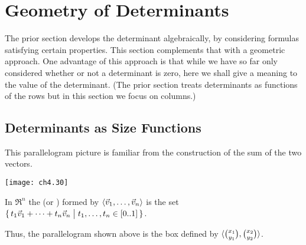 \section{Geometry of Determinants}
The prior section develops the determinant algebraically, by
considering formulas satisfying certain properties.
This section complements that with a geometric approach.
One advantage of this approach is that while 
we have so far only considered whether or not a determinant is zero,
here we shall give a meaning to the value of the determinant.
(The prior section treats determinants as functions of the
rows but in this section we focus on columns.)










\subsection{Determinants as Size Functions}
This parallelogram picture
is familiar from the construction of the sum of the two vectors.
\begin{center}
  \texttt{[image: ch4.30]}
\end{center}

\begin{definition}
In $\Re^n$
the 
(or )
formed by 
\( \langle\vec{v}_1,\dots,\vec{v}_n\rangle \) 
is the set
\( \mbox{$\{\,t_1\vec{v}_1+\dots+t_n\vec{v}_n
      \bigm| t_1,\ldots,t_n\in [0..1]\,\}$} \).
\end{definition}

\noindent Thus, the parallelogram shown above is the box defined by 
$\langle\binom{x_1}{y_1},\binom{x_2}{y_2}\rangle$.

